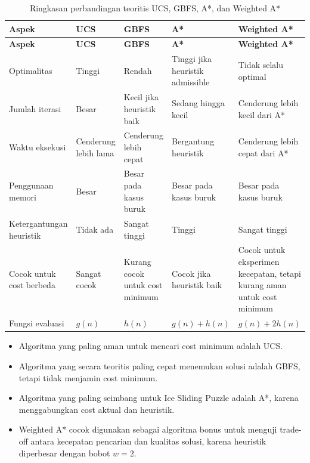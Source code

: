 \begin{longtable}{|p{3.5cm}|p{2.6cm}|p{2.6cm}|p{2.6cm}|p{2.8cm}|}
	\caption{Ringkasan perbandingan teoritis UCS, GBFS, A*, dan Weighted A*} \\
	\hline
	\rowcolor{gray!25}
	\textbf{Aspek} & \textbf{UCS} & \textbf{GBFS} & \textbf{A*} & \textbf{Weighted A*} \\
	\hline
	\endfirsthead
	
	\hline
	\rowcolor{gray!25}
	\textbf{Aspek} & \textbf{UCS} & \textbf{GBFS} & \textbf{A*} & \textbf{Weighted A*} \\
	\hline
	\endhead
	
	Optimalitas & Tinggi & Rendah & Tinggi jika heuristik admissible & Tidak selalu optimal \\
	\hline
	Jumlah iterasi & Besar & Kecil jika heuristik baik & Sedang hingga kecil & Cenderung lebih kecil dari A* \\
	\hline
	Waktu eksekusi & Cenderung lebih lama & Cenderung lebih cepat & Bergantung heuristik & Cenderung lebih cepat dari A* \\
	\hline
	Penggunaan memori & Besar & Besar pada kasus buruk & Besar pada kasus buruk & Besar pada kasus buruk \\
	\hline
	Ketergantungan heuristik & Tidak ada & Sangat tinggi & Tinggi & Sangat tinggi \\
	\hline
	Cocok untuk cost berbeda & Sangat cocok & Kurang cocok untuk cost minimum & Cocok jika heuristik baik & Cocok untuk eksperimen kecepatan, tetapi kurang aman untuk cost minimum \\
	\hline
	Fungsi evaluasi & $g(n)$ & $h(n)$ & $g(n)+h(n)$ & $g(n)+2h(n)$ \\
	\hline
\end{longtable}

\begin{tcolorbox}[
	colback=green!5,
	colframe=green!50!black,
	title=\textbf{Kesimpulan Teoritis},
	arc=2mm,
	boxrule=0.8pt
]
\begin{itemize}
	\item Algoritma yang paling aman untuk mencari cost minimum adalah UCS.
	\item Algoritma yang secara teoritis paling cepat menemukan solusi adalah GBFS, tetapi tidak menjamin cost minimum.
	\item Algoritma yang paling seimbang untuk Ice Sliding Puzzle adalah A*, karena menggabungkan cost aktual dan heuristik.
	\item Weighted A* cocok digunakan sebagai algoritma bonus untuk menguji trade-off antara kecepatan pencarian dan kualitas solusi, karena heuristik diperbesar dengan bobot $w=2$.
\end{itemize}
\end{tcolorbox}

